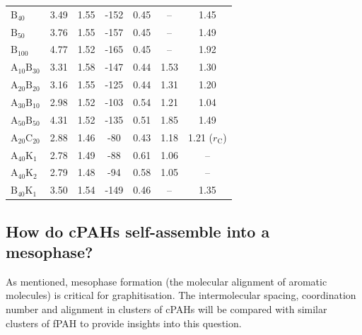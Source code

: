 \begin{table}[ht]
\begin{tabular}{lcccccc}
$\text{B}_{\text{40}}$ & 3.49 & 1.55 & -152 & 0.45 & -- & 1.45 \\
$\text{B}_{\text{50}}$ & 3.76 & 1.55 & -157 & 0.45 & -- & 1.49 \\
$\text{B}_{\text{100}}$ & 4.77 & 1.52 & -165 & 0.45 & -- & 1.92 \\ \hline
$\text{A}_{\text{10}}\text{B}_{\text{30}}$ & 3.31 & 1.58 & -147 & 0.44 & 1.53 & 1.30 \\ 
$\text{A}_{\text{20}}\text{B}_{\text{20}}$ & 3.16 & 1.55 & -125 & 0.44 & 1.31 & 1.20 \\
$\text{A}_{\text{30}}\text{B}_{\text{10}}$ & 2.98 & 1.52 & -103 & 0.54 &  1.21 & 1.04 \\
$\text{A}_{\text{50}}\text{B}_{\text{50}}$ & 4.31 & 1.52 & -135 & 0.51 &  1.85 & 1.49 \\ \hline
$\text{A}_{\text{20}}\text{C}_{\text{20}}$ & 2.88 & 1.46 & -80 & 0.43 &  1.18 & 1.21 ($r_{\text{C}}$) \\ \hline
$\text{A}_{\text{40}}\text{K}_{\text{1}}$ & 2.78 & 1.49 & -88 & 0.61 &  1.06 & -- \\
$\text{A}_{\text{40}}\text{K}_{\text{2}}$ & 2.79 & 1.48 & -94 & 0.58 &  1.05 & -- \\ 
$\text{B}_{\text{40}}\text{K}_{\text{1}}$ & 3.50 & 1.54 & -149 & 0.46 &  -- & 1.35 \\ 
\end{tabular}
\end{table}
%
%

\subsection{How do cPAHs self-assemble into a mesophase?} 

%
As mentioned, mesophase formation (the molecular alignment of aromatic molecules) is critical for graphitisation. The intermolecular spacing, coordination number and alignment in clusters of cPAHs will be compared with similar clusters of fPAH to provide insights into this question.

